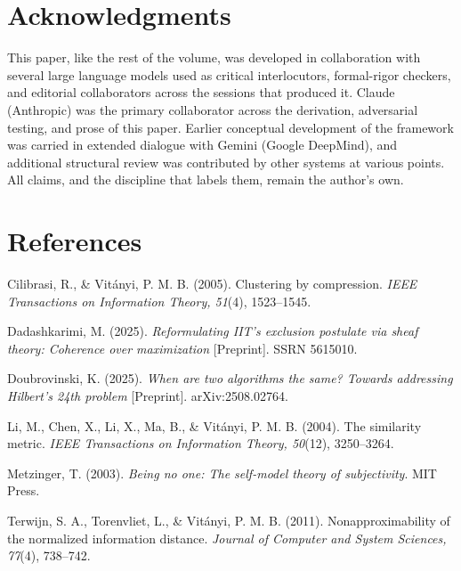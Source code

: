 \documentclass[11pt,oneside]{report}
\theoremstyle{definition}
\theoremstyle{remark}
\newenvironment{reflist}
  {\par\small\setlength{\parindent}{0pt}%
   \setlength{\leftskip}{1.6em}\setlength{\parindent}{-1.6em}%
   \setlength{\parskip}{0.4em}%
   \raggedright\hyphenpenalty=50\exhyphenpenalty=50\relax
   \sloppy}
  {\par}
\begin{document}
\section*{Acknowledgments}

This paper, like the rest of the volume, was developed in collaboration with
several large language models used as critical interlocutors, formal-rigor
checkers, and editorial collaborators across the sessions that produced it.
Claude (Anthropic) was the primary collaborator across the derivation,
adversarial testing, and prose of this paper. Earlier conceptual development of
the framework was carried in extended dialogue with Gemini (Google DeepMind),
and additional structural review was contributed by other systems at various
points. All claims, and the discipline that labels them, remain the author's
own.

\section*{References}
\begin{reflist}
Cilibrasi, R., \& Vit\'anyi, P. M. B. (2005). Clustering by compression.
\textit{IEEE Transactions on Information Theory, 51}(4), 1523--1545.

Dadashkarimi, M. (2025). \textit{Reformulating IIT's exclusion postulate via
sheaf theory: Coherence over maximization} [Preprint]. SSRN 5615010.

Doubrovinski, K. (2025). \textit{When are two algorithms the same? Towards
addressing Hilbert's 24th problem} [Preprint]. arXiv:2508.02764.

Li, M., Chen, X., Li, X., Ma, B., \& Vit\'anyi, P. M. B. (2004). The similarity
metric. \textit{IEEE Transactions on Information Theory, 50}(12), 3250--3264.

Metzinger, T. (2003). \textit{Being no one: The self-model theory of
subjectivity}. MIT Press.

Terwijn, S. A., Torenvliet, L., \& Vit\'anyi, P. M. B. (2011).
Nonapproximability of the normalized information distance. \textit{Journal of
Computer and System Sciences, 77}(4), 738--742.
\end{reflist}
\end{document}
